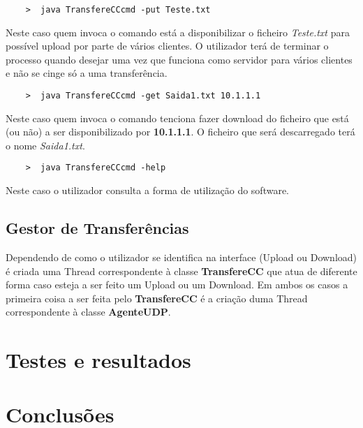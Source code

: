 \documentclass{llncs}
\begin{document}
\begin{verbatim}
	>  java TransfereCCcmd -put Teste.txt
\end{verbatim}

Neste caso quem invoca o comando está a disponibilizar o ficheiro \textit{Teste.txt} para possível upload por parte de vários clientes. O utilizador terá de terminar o processo quando desejar uma vez que funciona como servidor para vários clientes e não se cinge só a uma transferência.

\begin{verbatim}
	>  java TransfereCCcmd -get Saida1.txt 10.1.1.1
\end{verbatim}

Neste caso quem invoca o comando tenciona fazer download do ficheiro que está (ou não) a ser disponibilizado por \textbf{10.1.1.1}. O ficheiro que será descarregado terá o nome \textit{Saida1.txt}.

\begin{verbatim}
	>  java TransfereCCcmd -help
\end{verbatim}

Neste caso o utilizador consulta a forma de utilização do software.


\subsection{Gestor de Transferências}

Dependendo de como o utilizador se identifica na interface (Upload ou Download) é criada uma Thread correspondente à classe \textbf{TransfereCC} que atua de diferente forma caso esteja a ser feito um Upload ou um Download. Em ambos os casos a primeira coisa a ser feita pelo \textbf{TransfereCC} é a criação duma Thread correspondente à classe \textbf{AgenteUDP}.





\section{Testes e resultados}



\section{Conclusões}
\end{document}
